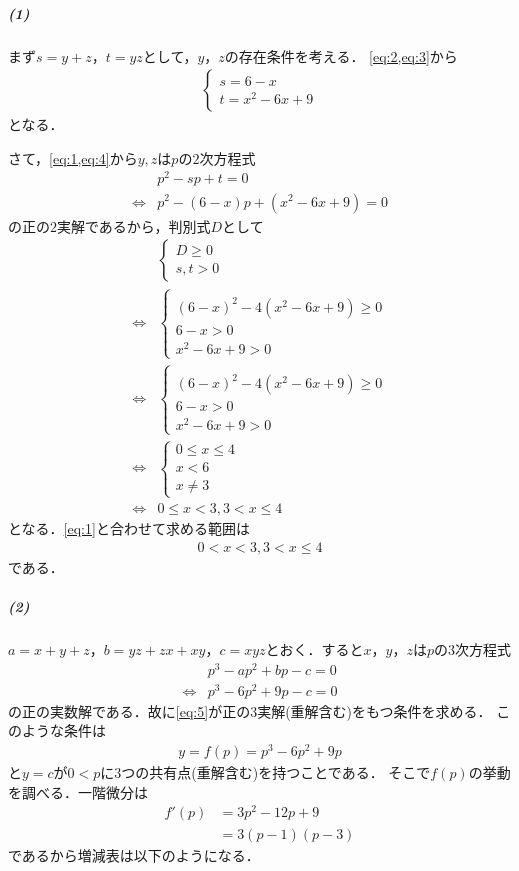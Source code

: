 \documentclass[../../main.tex]{subfiles}
\begin{document}
\subparagraph{(1)}

まず$s=y+z$，$t=yz$として，$y$，$z$の存在条件を考える．
\cref{eq:2,eq:3}から
\begin{align}
  \begin{cases}
    s=6-x \\
    t=x^2-6x+9
  \end{cases}\label{eq:4}
\end{align}
となる．

さて，\cref{eq:1,eq:4}から$y, z$は$p$の$2$次方程式
\begin{align}
  &p^2-sp+t=0\\
  \Longleftrightarrow &p^2-(6-x)p+(x^2-6x+9)=0
\end{align}
の正の$2$実解であるから，判別式$D$として
\begin{align}
  &
  \begin{cases}
    D\ge0  \\
    s,t>0
  \end{cases} \\
  \Longleftrightarrow
  &
  \begin{cases}\\
    (6-x)^2-4(x^2-6x+9)\ge0  \\
    6-x>0  \\
    x^2-6x+9>0
  \end{cases} \\
  \Longleftrightarrow
  &
  \begin{cases}\\
    (6-x)^2-4(x^2-6x+9)\ge0  \\
    6-x>0  \\
    x^2-6x+9>0
  \end{cases} \\
  \Longleftrightarrow
  &
  \begin{cases}
    0\le x\le 4  \\
    x<6  \\
    x \neq 3
  \end{cases} \\
  \Longleftrightarrow
  &   0\le x<3,3<x\le 4
\end{align}
となる．\cref{eq:1}と合わせて求める範囲は
\begin{align}
  0< x<3,3<x\le 4 \tag{(答)}
\end{align}
である．

\subparagraph{(2)}
$a=x+y+z$，$b=yz+zx+xy$，$c=xyz$とおく．すると$x$，$y$，$z$は$p$の$3$次方程式
\begin{align}
  &p^3-ap^2+bp-c=0  \nonumber\\
  \Longleftrightarrow&p^3-6p^2+9p-c=0 \label{eq:5}
\end{align}
の正の実数解である．故に\cref{eq:5}が正の$3$実解(重解含む)をもつ条件を求める．
このような条件は
\begin{align}
  y=f(p)=p^3-6p^2+9p
\end{align}
と$y=c$が$0<p$に$3$つの共有点(重解含む)を持つことである．
そこで$f(p)$の挙動を調べる．一階微分は
\begin{align}
  f'(p)&=3p^2-12p+9  \\
  &=3(p-1)(p-3)
\end{align}
であるから増減表は以下のようになる．
\end{document}

